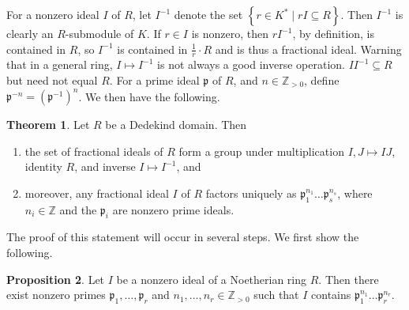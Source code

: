 \documentclass{article}
\newcommand{\Z}{\mathbb{Z}}
\newcommand{\rb}[1]{\left( #1 \right)}
\newcommand{\cb}[1]{\left\{ #1 \right\}}
\theoremstyle{definition}\newtheorem{definition}{Definition}[subsection]
\theoremstyle{definition}\newtheorem{remark}[definition]{Remark}
\theoremstyle{definition}\newtheorem*{example}{Example}
\theoremstyle{definition}\newtheorem*{note}{Note}
\newtheorem{proposition}[definition]{Proposition}
\newtheorem{theorem}[definition]{Theorem}
\begin{document}
For a nonzero ideal $ I $ of $ R $, let $ I^{-1} $ denote the set $ \cb{r \in K^* \mid rI \subseteq R} $. Then $ I^{-1} $ is clearly an $ R $-submodule of $ K $. If $ r \in I $ is nonzero, then $ rI^{-1} $, by definition, is contained in $ R $, so $ I^{-1} $ is contained in $ \tfrac{1}{r} \cdot R $ and is thus a fractional ideal. Warning that in a general ring, $ I \mapsto I^{-1} $ is not always a good inverse operation. $ II^{-1} \subseteq R $ but need not equal $ R $. For a prime ideal $ \mathfrak{p} $ of $ R $, and $ n \in \Z_{> 0} $, define $ \mathfrak{p}^{-n} = \rb{\mathfrak{p}^{-1}}^n $. We then have the following.

\begin{theorem}
Let $ R $ be a Dedekind domain. Then
\begin{enumerate}
\item the set of fractional ideals of $ R $ form a group under multiplication $ I, J \mapsto IJ $, identity $ R $, and inverse $ I \mapsto I^{-1} $, and
\item moreover, any fractional ideal $ I $ of $ R $ factors uniquely as $ \mathfrak{p}_1^{n_1} \dots \mathfrak{p}_s^{n_s} $, where $ n_i \in \Z $ and the $ \mathfrak{p}_i $ are nonzero prime ideals.
\end{enumerate}
\end{theorem}


The proof of this statement will occur in several steps. We first show the following.

\begin{proposition}
Let $ I $ be a nonzero ideal of a Noetherian ring $ R $. Then there exist nonzero primes $ \mathfrak{p}_1, \dots, \mathfrak{p}_r $ and $ n_1, \dots, n_r \in \Z_{> 0} $ such that $ I $ contains $ \mathfrak{p}_1^{n_1} \dots \mathfrak{p}_r^{n_r} $.
\end{proposition}
\end{document}
